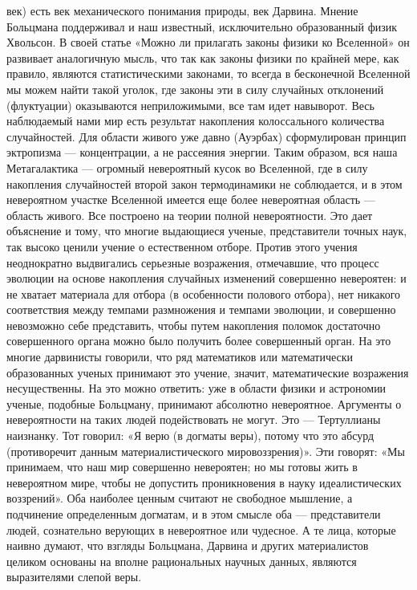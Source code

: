 век)  есть век  механического понимания  природы, век  Дарвина. Мнение
Больцмана  поддерживал  и  наш известный,  исключительно  образованный
физик Хвольсон.  В своей статье  «Можно ли прилагать законы  физики ко
Вселенной» он развивает  аналогичную мысль, что так  как законы физики
по крайней  мере, как  правило, являются статистическими  законами, то
всегда  в  бесконечной Вселенной  мы  можем  найти такой  уголок,  где
законы  эти  в  силу  случайных  отклонений  (флуктуации)  оказываются
неприложимыми,  все  там идет  навыворот.  Весь  наблюдаемый нами  мир
есть результат  накопления колоссального количества  случайностей. Для
области живого  уже давно  (Ауэрбах) сформулирован  принцип эктропизма
---  концентрации,   а  не  рассеяния  энергии.   Таким  образом,  вся
наша  Метагалактика  ---  огромный  невероятный  кусок  во  Вселенной,
где  в  силу накопления  случайностей  второй  закон термодинамики  не
соблюдается,  и  в  этом  невероятном участке  Вселенной  имеется  еще
более  невероятная  область  ---  область  живого.  Все  построено  на
теории полной  невероятности. Это дает  объяснение и тому,  что многие
выдающиеся  ученые,  представители  точных  наук,  так  высоко  ценили
учение  о  естественном  отборе.   Против  этого  учения  неоднократно
выдвигались серьезные возражения, отмечавшие,  что процесс эволюции на
основе  накопления случайных  изменений  совершенно  невероятен: и  не
хватает  материала для  отбора  (в особенности  полового отбора),  нет
никакого соответствия между темпами  размножения и темпами эволюции, и
совершенно невозможно себе представить, чтобы путем накопления поломок
достаточно совершенного  органа можно было получить  более совершенный
орган.  На это  многие дарвинисты  говорили, что  ряд математиков  или
математически  образованных  ученых   принимают  это  учение,  значит,
математические возражения несущественны. На  это можно ответить: уже в
области  физики и  астрономии  ученые,  подобные Больцману,  принимают
абсолютно  невероятное.  Аргументы  о  невероятности  на  таких  людей
подействовать не могут. Это --- Тертуллианы наизнанку. Тот говорил: «Я
верю  (в догматы  веры), потому  что это  абсурд (противоречит  данным
материалистического мировоззрения)».  Эти говорят: «Мы  принимаем, что
наш мир совершенно  невероятен; но мы готовы жить  в невероятном мире,
чтобы не  допустить проникновения в науку  идеалистических воззрений».
Оба  наиболее  ценным  считают  не свободное  мышление,  а  подчинение
определенным догматам,  и в этом  смысле оба ---  представители людей,
сознательно верующих  в невероятное или  чудесное. А те  лица, которые
наивно думают,  что взгляды Больцмана, Дарвина  и других материалистов
целиком  основаны  на  вполне рациональных  научных  данных,  являются
выразителями слепой веры.

